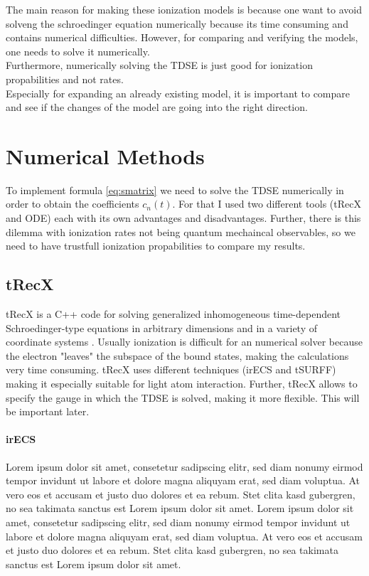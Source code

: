 The main reason for making these ionization models is because one want to avoid solveng the schroedinger equation numerically because its time consuming and contains numerical difficulties.
However, for comparing and verifying the models, one needs to solve it numerically.\\
Furthermore, numerically solving the TDSE is just good for ionization propabilities and not rates.\\
Especially for expanding an already existing model, it is important to compare and see if the changes of the model are going into the right direction.



\section{Numerical Methods}
To implement formula \ref{eq:smatrix} we need to solve the TDSE numerically in order to obtain the coefficients $c_n(t)$. 
For that I used two different tools (tRecX and ODE) each with its own advantages and disadvantages.
Further, there is this dilemma with ionization rates not being quantum mechaincal observables, so we need to have trustfull ionization propabilities to compare my results.



\subsection{tRecX}
tRecX is a C++ code for solving generalized inhomogeneous time-dependent
Schroedinger-type equations in arbitrary dimensions and in a variety of coordinate systems \cite{Scrinzi_trecx}.
Usually ionization is difficult for an numerical solver because the electron "leaves" the subspace of the bound states, making the calculations very time consuming.
tRecX uses different techniques (irECS and tSURFF) making it especially suitable for light atom interaction. 
Further, tRecX allows to specify the gauge in which the TDSE is solved, making it more flexible. 
This will be important later.

\paragraph{irECS}
Lorem ipsum dolor sit amet, consetetur sadipscing elitr, sed diam nonumy eirmod tempor invidunt ut labore et dolore magna aliquyam erat, sed diam voluptua. At vero eos et accusam et justo duo dolores et ea rebum. Stet clita kasd gubergren, no sea takimata sanctus est Lorem ipsum dolor sit amet. Lorem ipsum dolor sit amet, consetetur sadipscing elitr, sed diam nonumy eirmod tempor invidunt ut labore et dolore magna aliquyam erat, sed diam voluptua. At vero eos et accusam et justo duo dolores et ea rebum. Stet clita kasd gubergren, no sea takimata sanctus est Lorem ipsum dolor sit amet.

